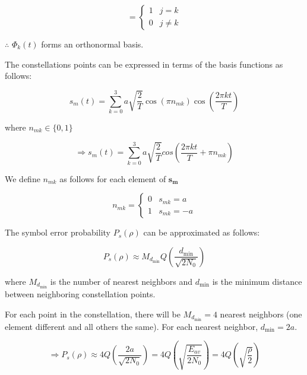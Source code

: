 \documentclass[fleqn]{article}
\begin{document}
\begin{enumerate}
		\begin{equation*}
			= \begin{cases}
				1 & j = k \\
				0 & j \neq k
			\end{cases}
		\end{equation*}
		
		$\therefore$ $\Phi_k(t)$ forms an orthonormal basis.
		
		The constellations points can be expressed in terms of the basis functions as follows:
		
		\begin{equation*}
			s_m(t) = \sum_{k=0}^{3}{a\sqrt{\frac{2}{T}}\cos({\pi}n_{mk})\cos\left(\frac{2{\pi}kt}{T}\right)}
		\end{equation*}
		
		where $n_{mk} \in \{0, 1\}$
		
		\begin{equation*}
			\Rightarrow s_m(t) = \sum_{k=0}^{3}{a\sqrt{\frac{2}{T}}cos\left(\frac{2{\pi}kt}{T}+{\pi}n_{mk}\right)}
		\end{equation*}
		
		We define $n_{mk}$ as follows for each element of $\mathbf{s_m}$
		
		\begin{equation*}
			n_{mk} = \begin{cases}
				0 & s_{mk} = a\\
				1 & s_{mk} = -a
			\end{cases}
		\end{equation*}
		
		The symbol error probability $P_s(\rho)$ can be approximated as follows:
		
		\begin{equation*}
			P_s(\rho) \approx M_{d_\text{min}}Q\left(\frac{d_\text{min}}{\sqrt{2N_0}}\right)
		\end{equation*}
		
		where $M_{d_\text{min}}$ is the number of nearest neighbors and $d_\text{min}$ is the minimum distance between neighboring constellation points.
		
		For each point in the constellation, there will be $M_{d_\text{min}} = 4$ nearest neighbors (one element different and all others the same). For each nearest neighbor, $d_\text{min} = 2a$.
		
		\begin{equation*}
			\Rightarrow P_s(\rho) \approx 4Q\left(\frac{2a}{\sqrt{2N_0}}\right) = 4Q\left(\sqrt{\frac{E_{av}}{2N_0}}\right)= 4Q\left(\sqrt{\frac{\rho}{2}}\right)
		\end{equation*}
		

\end{enumerate}
\end{document}
